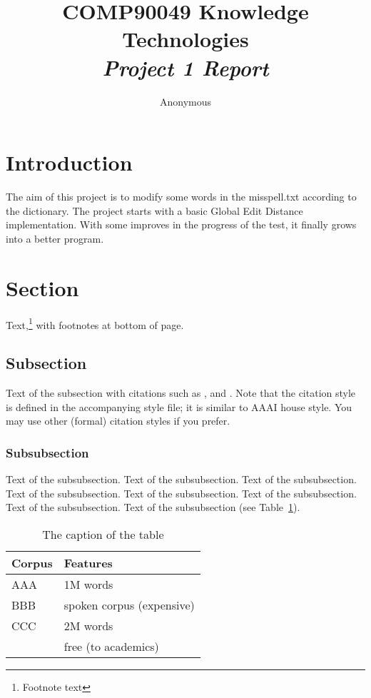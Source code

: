\documentclass[11pt]{article}
\title{COMP90049 Knowledge Technologies
\\ \Large \textit{Project 1 Report}}
\author
{Anonymous}
\begin{document}
\maketitle


\section{Introduction}
The aim of this project is to modify some words in the misspell.txt according to the dictionary. The project starts with a basic Global Edit Distance implementation. With some improves in the progress of the test, it finally grows into a better program.


\section{Section}

Text,\footnote{Footnote text} with footnotes at bottom of page.


\subsection{Subsection}

Text of the subsection with citations such as 
,  and .
Note that the citation style is defined in the accompanying
style file; it is similar to AAAI house style. You may use
other (formal) citation styles if you prefer.

 
\subsubsection{Subsubsection}

Text of the subsubsection.
Text of the subsubsection.
Text of the subsubsection.
Text of the subsubsection.
Text of the subsubsection.
Text of the subsubsection.
Text of the subsubsection.
Text of the subsubsection (see Table~\ref{table1}).

\begin{table}[h]
 \begin{center}
\begin{tabular}{|l|l|}

      \hline
      Corpus & Features\\
      \hline\hline
      AAA & 1M words\\
      BBB & spoken corpus (expensive)\\
      CCC & 2M words\\
        & free (to academics)\\
      \hline

\end{tabular}
\caption{The caption of the table}\label{table1}
 \end{center}
\end{table}
\end{document}
